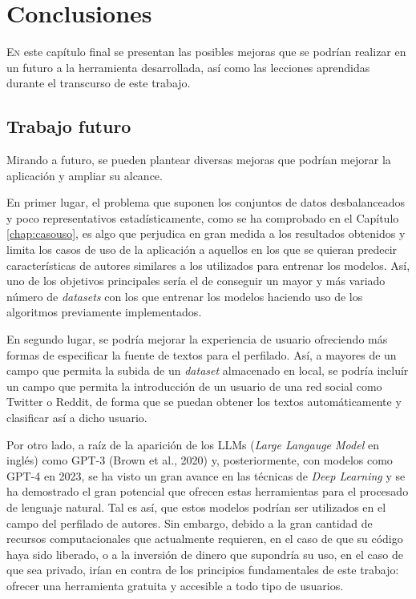 \chapter{Conclusiones}
\label{chap:conclusiones}

\lettrine{E}{n} este capítulo final se presentan las posibles mejoras que se podrían realizar en un futuro a la herramienta desarrollada,
así como las lecciones aprendidas durante el transcurso de este trabajo.


\section{Trabajo futuro}
\label{sec:trabajo_futuro}

Mirando a futuro, se pueden plantear diversas mejoras que podrían mejorar la aplicación y ampliar su alcance.

\bigskip
En primer lugar, el problema que suponen los conjuntos de datos desbalanceados y poco representativos estadísticamente, como se ha comprobado en el Capítulo \ref{chap:casouso},
es algo que perjudica en gran medida a los resultados obtenidos y limita los casos de uso de la aplicación a aquellos en los que se quieran predecir características
de autores similares a los utilizados para entrenar los modelos. Así, uno de los objetivos principales sería el de conseguir un mayor y más variado número de \textit{datasets}
con los que entrenar los modelos haciendo uso de los algoritmos previamente implementados.

\bigskip
En segundo lugar, se podría mejorar la experiencia de usuario ofreciendo más formas de especificar la fuente de textos para el perfilado.
Así, a mayores de un campo que permita la subida de un \textit{dataset} almacenado en local, se podría incluír un campo que permita la introducción
de un usuario de una red social como Twitter o Reddit, de forma que se puedan obtener los textos automáticamente y clasificar así a dicho usuario.

\bigskip
Por otro lado, a raíz de la aparición de los LLMs (\textit{Large Langauge Model} en inglés) como GPT-3 (Brown et al., 2020) \cite{brown2020language}
y, posteriormente, con modelos como GPT-4 en 2023, se ha visto un gran avance en las técnicas de \textit{Deep Learning}
y se ha demostrado el gran potencial que ofrecen estas herramientas para el procesado de lenguaje natural. Tal es así, que estos modelos
podrían ser utilizados en el campo del perfilado de autores. Sin embargo, debido a la gran cantidad de recursos
computacionales que actualmente requieren, en el caso de que su código haya sido liberado, o a la inversión de dinero que supondría su uso, en el caso
de que sea privado, irían en contra de los principios fundamentales de este trabajo: ofrecer una herramienta gratuita
y accesible a todo tipo de usuarios.

